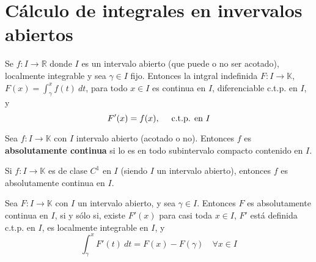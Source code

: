 \documentclass[12pt]{report}
\theoremstyle{largebreak}
\newcommand{\cf}[3]{\ensuremath{#1:#2\rightarrow#3}}
\begin{document}
	\section{Cálculo de integrales en invervalos abiertos}

	\begin{theor}
		Se $\cf{f}{I}{\mathbb{R}}$ donde $I$ es un intervalo abierto (que puede o no ser acotado), localmente integrable y sea $\gamma\in I$ fijo.
		Entonces la intgral indefinida $\cf{F}{I}{\mathbb{K}}$, $F(x)=\int_{{\gamma}}^{{x}} {f(t)} \: d{t}$, para todo $x\in I$ es continua en $I$, diferenciable c.t.p. en $I$, y
		\begin{equation*}
			F'(x)=f(x),\quad\textup{ c.t.p. en }I
		\end{equation*}
		
	\end{theor}

	\begin{cor}
			
	\end{cor}
	

	\begin{mydef}
		Sea $\cf{f}{I}{\mathbb{K}}$ con $I$ intervalo abierto (acotado o no). Entonces $f$ es \textbf{absolutamente continua} si lo es en todo subintervalo compacto contenido en $I$.
	\end{mydef}
	
	\begin{propo}
		Si $\cf{f}{I}{\mathbb{K}}$ es de clase $C^1$ en $I$ (siendo $I$ un intervalo abierto), entonces $f$ es absolutamente continua en $I$.
	\end{propo}
	
	\begin{theor}
	Sea $\cf{F}{I}{\mathbb{K}}$ con $I$ un intervalo abierto, y sea $\gamma\in I$. Entonces $F$	es absolutamente continua en $I$, si y sólo si, existe $F'(x)$ para casi toda $x\in I$, $F'$ está definida c.t.p. en $I$, es localmente integrable en $I$, y
	\begin{equation*}
		\int_{{\gamma}}^{{x}} {F'(t)} \: d{t}={F(x)-F(\gamma)\quad \forall x\in I}
	\end{equation*}
	
	\end{theor}

	\begin{theor}
		
	\end{theor}
	

	\begin{theor}
		
	\end{theor}
	
\end{document}
